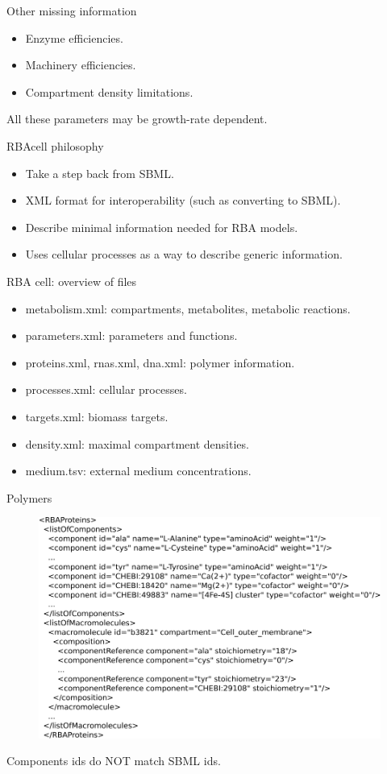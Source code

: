 \documentclass{beamer}
\begin{document}
\begin{frame}{Other missing information}
  \begin{itemize}
    \item Enzyme efficiencies.
    \item Machinery efficiencies.
    \item Compartment density limitations.
  \end{itemize}
  All these parameters may be growth-rate dependent.
\end{frame}

\begin{frame}{RBAcell philosophy}
  \begin{itemize}
    \item Take a step back from SBML.
    \item XML format for interoperability (such as converting to SBML).
    \item Describe minimal information needed for RBA models.
    \item Uses cellular processes as a way to describe generic information.
  \end{itemize}
\end{frame}

\begin{frame}{RBA cell: overview of files}
  \begin{itemize}
    \item metabolism.xml: compartments, metabolites, metabolic reactions.
    \item parameters.xml: parameters and functions.
    \item proteins.xml, rnas.xml, dna.xml: polymer information.
    \item processes.xml: cellular processes.
    \item targets.xml: biomass targets.
    \item density.xml: maximal compartment densities.
    \item medium.tsv: external medium concentrations.
  \end{itemize}
\end{frame}

\begin{frame}{Polymers}
  \begin{figure}
    \centering
    \includegraphics[width=\linewidth]{polymers}
  \end{figure}
  Components ids do NOT match SBML ids.
\end{frame}
\end{document}
